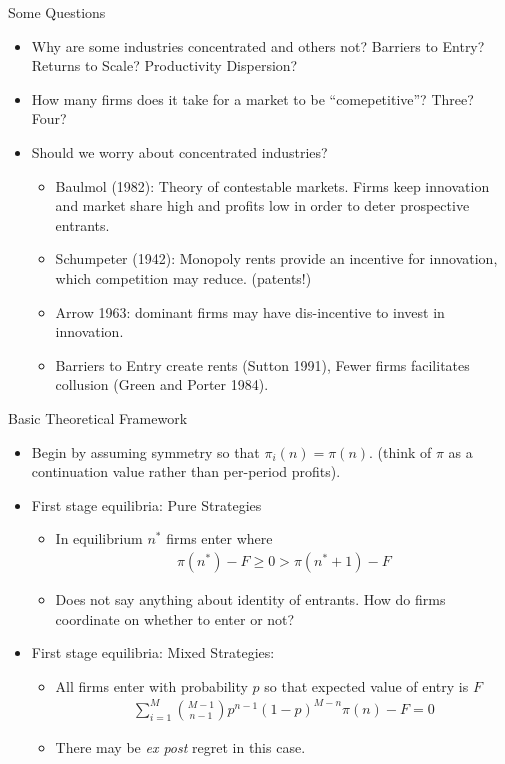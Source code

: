 \begin{frame}{Some Questions}
\begin{itemize}
\item Why are some industries concentrated and others not? Barriers to Entry? Returns to Scale? Productivity Dispersion?
\item How many firms does it take for a market to be ``comepetitive''? Three? Four?
\item Should we worry about concentrated industries?
\begin{itemize}
\item Baulmol (1982): Theory of \alert{contestable} markets. Firms keep innovation and market share high and profits low in order to deter prospective entrants.
\item Schumpeter (1942): Monopoly rents provide an incentive for \alert{innovation}, which competition may reduce. (patents!)
\item Arrow 1963: dominant firms may have dis-incentive to invest in innovation.
\item Barriers to Entry create rents (Sutton 1991), Fewer firms facilitates collusion (Green and Porter 1984).
\end{itemize}
\end{itemize}
\end{frame} 


\begin{frame}{Basic Theoretical Framework}
\begin{itemize}
\item Begin by assuming symmetry so that $\pi_i(n) = \pi(n)$. (think of $\pi$ as a continuation value rather than per-period profits).
\item First stage equilibria: Pure Strategies
\begin{itemize}
\item In equilibrium $n^*$ firms enter where 
\begin{eqnarray*}
\pi(n^*)  - F \geq 0 > \pi(n^* +1) -F
\end{eqnarray*}
\item Does not say anything about identity of entrants. How do firms coordinate on whether to enter or not?
\end{itemize}
\item First stage equilibria: Mixed Strategies:
\begin{itemize}
\item All firms enter with probability $p$ so that expected value of entry is $F$
\begin{eqnarray*}
\sum_{i=1}^M {{M-1}\choose{n-1}} p^{n-1} (1-p)^{M-n} \pi(n) - F = 0
\end{eqnarray*}
\item There may be \textit{ex post} regret in this case.
\end{itemize}
\end{itemize}
\end{frame} 

